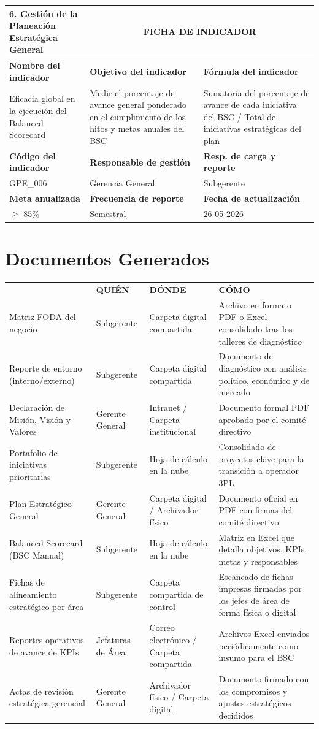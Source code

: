 \documentclass[11pt,letterpaper]{report}
\newcommand{\fichaIndicador}[9]{
  \noindent
  \begin{tabularx}{\textwidth}{p{0.25\textwidth}XX}
  \toprule
  \textbf{#1} & \multicolumn{2}{c}{\textbf{FICHA DE INDICADOR}} \\
  \midrule
  \textbf{Nombre del indicador} & \textbf{Objetivo del indicador} & \textbf{Fórmula del indicador} \\
  #2 & #3 & #4 \\
  \midrule
  \textbf{Código del indicador} & \textbf{Responsable de gestión} & \textbf{Resp. de carga y reporte} \\
  #5 & #6 & #7 \\
  \midrule
  \textbf{Meta anualizada} & \textbf{Frecuencia de reporte} & \textbf{Fecha de actualización} \\
  #8 & #9 & 26-05-2026 \\
  \bottomrule
  \end{tabularx}
  \vspace{1.5em}
}
\begin{document}
\fichaIndicador{6. Gestión de la Planeación Estratégica General}{Eficacia global en la ejecución del Balanced Scorecard}{Medir el porcentaje de avance general ponderado en el cumplimiento de los hitos y metas anuales del BSC}{Sumatoria del porcentaje de avance de cada iniciativa del BSC / Total de iniciativas estratégicas del plan}{GPE\_006}{Gerencia General}{Subgerente}{$\ge$ 85\%}{Semestral}

\newpage

\chapter{Documentos Generados}

\begin{tabularx}{\textwidth}{>{\raggedright\arraybackslash}X >{\raggedright\arraybackslash}p{} >{\raggedright\arraybackslash}p{} >{\raggedright\arraybackslash}X}
\toprule
\multirow{2}{*}{\textbf{DOCUMENTO (QUÉ)}} & \multicolumn{3}{c}{\textbf{CUSTODIA}} \\
\cmidrule{2-4}
& \textbf{QUIÉN} & \textbf{DÓNDE} & \textbf{CÓMO} \\
\midrule
Matriz FODA del negocio & Subgerente & Carpeta digital compartida & Archivo en formato PDF o Excel consolidado tras los talleres de diagnóstico \\
\midrule
Reporte de entorno (interno/externo) & Subgerente & Carpeta digital compartida & Documento de diagnóstico con análisis político, económico y de mercado \\
\midrule
Declaración de Misión, Visión y Valores & Gerente General & Intranet / Carpeta institucional & Documento formal PDF aprobado por el comité directivo \\
\midrule
Portafolio de iniciativas prioritarias & Subgerente & Hoja de cálculo en la nube & Consolidado de proyectos clave para la transición a operador 3PL \\
\midrule
Plan Estratégico General & Gerente General & Carpeta digital / Archivador físico & Documento oficial en PDF con firmas del comité directivo \\
\midrule
Balanced Scorecard (BSC Manual) & Subgerente & Hoja de cálculo en la nube & Matriz en Excel que detalla objetivos, KPIs, metas y responsables \\
\midrule
Fichas de alineamiento estratégico por área & Subgerente & Carpeta compartida de control & Escaneado de fichas impresas firmadas por los jefes de área de forma física o digital \\
\midrule
Reportes operativos de avance de KPIs & Jefaturas de Área & Correo electrónico / Carpeta compartida & Archivos Excel enviados periódicamente como insumo para el BSC \\
\midrule
Actas de revisión estratégica gerencial & Gerente General & Archivador físico / Carpeta digital & Documento firmado con los compromisos y ajustes estratégicos decididos \\
\bottomrule
\end{tabularx}
\end{document}
